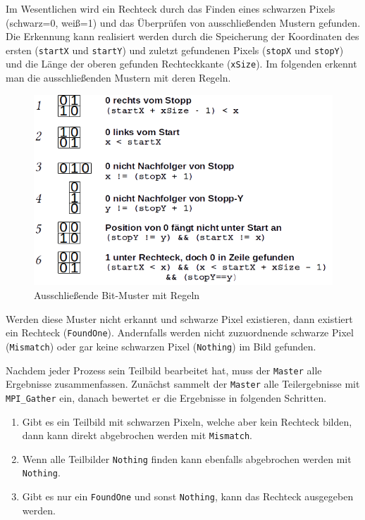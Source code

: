 Im Wesentlichen wird ein Rechteck durch das Finden eines schwarzen Pixels \linebreak(schwarz=0, weiß=1) und das Überprüfen von ausschließenden Mustern gefunden. 
Die Erkennung kann realisiert werden durch die Speicherung der Koordinaten des ersten (\texttt{startX} und \texttt{startY}) und zuletzt gefundenen Pixels (\texttt{stopX} und \texttt{stopY}) und die Länge der oberen gefunden Rechteckkante (\texttt{xSize}). Im folgenden erkennt man die ausschließenden Mustern mit deren Regeln.
\begin{figure}[htb]
    \centering
    \includegraphics[scale=0.75]{mismatches.png}
    \caption{Ausschließende Bit-Muster mit Regeln}
    \label{fig:mismatches}
\end{figure}

Werden diese Muster nicht erkannt und schwarze Pixel existieren, dann existiert ein Rechteck (\texttt{FoundOne}). Andernfalls werden nicht zuzuordnende schwarze Pixel (\texttt{Mismatch}) oder gar keine schwarzen Pixel (\texttt{Nothing}) im Bild gefunden.

Nachdem jeder Prozess sein Teilbild bearbeitet hat, muss der \texttt{Master} alle Ergebnisse zusammenfassen. Zunächst sammelt der \texttt{Master} alle Teilergebnisse mit \texttt{MPI\_Gather} ein, danach bewertet er die Ergebnisse in folgenden Schritten.

\begin{enumerate}
	\item Gibt es ein Teilbild mit schwarzen Pixeln, welche aber kein Rechteck bilden, dann kann direkt abgebrochen werden mit \texttt{Mismatch}.
	\item Wenn alle Teilbilder \texttt{Nothing} finden kann ebenfalls abgebrochen werden mit \texttt{Nothing}.
	\item Gibt es nur ein \texttt{FoundOne} und sonst \texttt{Nothing}, kann das Rechteck ausgegeben werden.
\end{enumerate}

